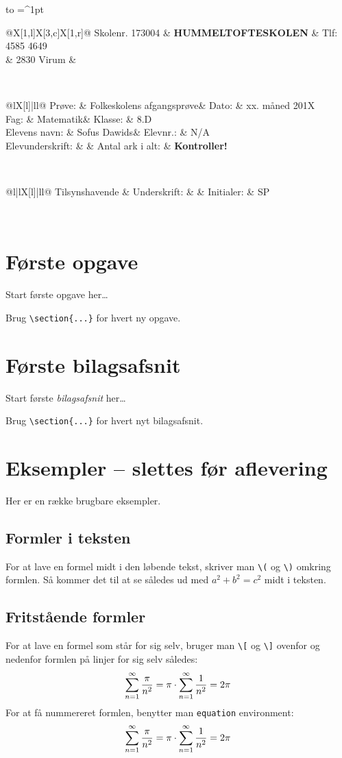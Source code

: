 \documentclass[a4,12pt]{article}
\makeatletter
\numberwithin{equation}{section}
\numberwithin{table}{section}
\numberwithin{figure}{section}
\newcommand{\skoleklasse}{8.D} %
\newcommand{\proevetype}{Folkeskolens afgangsprøve}
\newcommand{\proevefag}{Matematik}
\newcommand{\elevnavn}{Sofus Dawids}
\newcommand{\elevnummer}{N/A} %
\newcommand{\tilsynshavende}{SP} %
\newcommand{\eksamensdato}{xx. måned 201X} %
\newcommand{\antalarkialt}{\pageref*{LastPage} \textbf{Kontroller!}} %
\newcommand{\eksamensforsideboks}{
\noindent
\begin{tabu} to  \textwidth {|X[c]|}
  \hline
  \tabulinesep=^1pt
  \begin{tabu} {@{}X[1,l]X[3,c]X[1,r]@{}}
    Skolenr. 173004 & {\large \textbf{HUMMELTOFTESKOLEN}} & Tlf: 4585 4649 \\
  & 2830 Virum & \\
  \end{tabu} \\
  \hline
  \begin{tabu} {@{}lX[l]|ll@{}}
    Prøve: & \proevetype & Dato: & \eksamensdato \\
    Fag: & \proevefag & Klasse: & \skoleklasse \\
    Elevens navn: & \elevnavn & Elevnr.: & \elevnummer \\
    Elevunderskrift: & & Antal ark i alt: & \antalarkialt \\[0.5cm]
  \end{tabu} \\
  \hline
  \begin{tabu} {@{}l|lX[l]|ll@{}}
    Tilsynshavende & Underskrift: & & Initialer: & \tilsynshavende \\[0.5cm]
  \end{tabu} \\
  \hline
\end{tabu}
\vspace{1cm}
}
\newcommand*{\tableofcontentsnobreak}{\@starttoc{toc}}
\makeatother
\begin{document}
\thispagestyle{plain}
\eksamensforsideboks

\tableofcontentsnobreak

\section{Første opgave}
Start første opgave her\ldots

Brug \verb$\section{...}$ for hvert ny opgave.

\appendix
\section{Første bilagsafsnit}
Start første \emph{bilagsafsnit} her\ldots

Brug \verb$\section{...}$ for hvert nyt bilagsafsnit.

\section{Eksempler -- slettes før aflevering}
Her er en række brugbare eksempler.

\subsection{Formler i teksten}
For at lave en formel midt i den løbende tekst, skriver man \verb$\($ og \verb$\)$ omkring formlen.
Så kommer det til at se således ud med \( a^2 + b^2 = c^2 \) midt i teksten.

\subsection{Fritstående formler}
For at lave en formel som står for sig selv, bruger man \verb$\[$ og \verb$\]$ ovenfor og nedenfor formlen på linjer for sig selv således:
\[
  \sum\limits_{n=1}^\infty{\pi \over n^2}
    = \pi \cdot \sum\limits_{n=1}^\infty{1 \over n^2}
    = 2\pi
\]
For at få nummereret formlen, benytter man \verb$equation$ environment:
\begin{equation}
  \sum\limits_{n=1}^\infty{\pi \over n^2}
    = \pi \cdot \sum\limits_{n=1}^\infty{1 \over n^2}
    = 2\pi
\end{equation}
\end{document}
